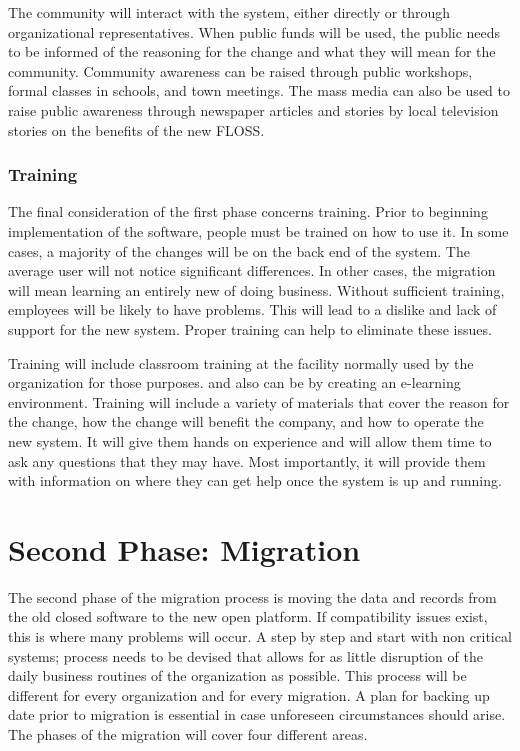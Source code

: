     The community will interact with the system, either directly or through organizational representatives. When public funds will be used, the public needs to be informed of the reasoning for the change and what they will mean for the community. Community awareness can be raised through public workshops, formal classes in schools, and town meetings. The mass media can also be used to raise public awareness through newspaper articles and stories by local television stories on the benefits of the new FLOSS. 
    
    \subsubsection{Training}
    The final consideration of the first phase concerns training. Prior to beginning implementation of the software, people must be trained on how to use it. In some cases, a majority of the changes will be on the back end of the system. The average user will not notice significant differences. In other cases, the migration will mean learning an entirely new of doing business. Without sufficient training, employees will be likely to have problems. This will lead to a dislike and lack of support for the new system. Proper training can help to eliminate these issues. 
    
    Training will include classroom training at the facility normally used by the organization for those purposes. and also can be by creating an e-learning environment. Training will include a variety of materials that cover the reason for the change, how the change will benefit the company, and how to operate the new system. It will give them hands on experience and will allow them time to ask any questions that they may have. Most importantly, it will provide them with information on where they can get help once the system is up and running.
    
    \section{Second Phase: Migration}
    
    The second phase of the migration process is moving the data and records from the old closed software to the new open platform. If compatibility issues exist, this is where many problems will occur.  A step by step and start with non critical systems; process needs to be devised that allows for as little disruption of the daily business routines of the organization as possible. This process will be different for every organization and for every migration. A plan for backing up date prior to migration is essential in case unforeseen circumstances should arise. The phases of the migration will cover four different areas. 
    
